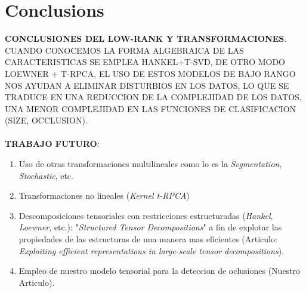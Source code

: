 \documentclass[sensors,article,submit,moreauthors,pdftex]{Definitions/mdpi}
\begin{document}
%
%
%

\section{Conclusions}
\textbf{CONCLUSIONES DEL LOW-RANK Y TRANSFORMACIONES}. CUANDO CONOCEMOS LA FORMA ALGEBRAICA DE LAS CARACTERISTICAS SE EMPLEA HANKEL+T-SVD, DE OTRO MODO LOEWNER + T-RPCA, EL USO DE ESTOS MODELOS DE BAJO RANGO NOS AYUDAN A ELIMINAR DISTURBIOS EN LOS DATOS, LO QUE SE TRADUCE EN UNA REDUCCION DE LA COMPLEJIDAD DE LOS DATOS, UNA MENOR COMPLEJIDAD EN LAS FUNCIONES DE CLASIFICACION (SIZE, OCCLUSION).
\\
\\
\textbf{TRABAJO FUTURO}: 
\begin{enumerate}[leftmargin=*,labelsep=4.9mm]
	\item 	Uso de otras transformaciones multilineales como lo es la \textit{Segmentation}, \textit{Stochastic}, etc.
	\item 	Transformaciones no lineales (\textit{Kernel t-RPCA})
	\item	Descomposiciones tensoriales con restricciones estructuradas (\textit{Hankel}, \textit{Loewner}, etc.): "\textit{Structured Tensor Decompositions}" a fin de explotar las propiedades de las estructuras de una manera mas eficientes (Articulo: \textit{Exploiting efficient representations in large-scale tensor decompositions}).
	\item	Empleo de nuestro modelo tensorial para la deteccion de oclusiones (Nuestro Articulo).
\end{enumerate}
\end{document}

